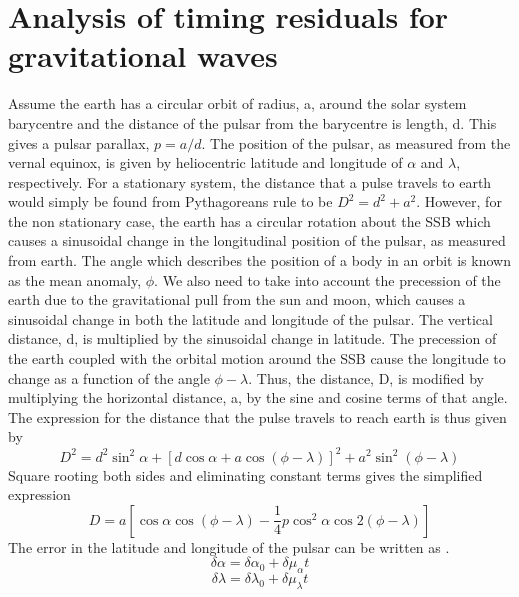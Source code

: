 \documentclass[12pt]{article}
\begin{document}
	\section{Analysis of timing residuals for gravitational waves}\label{Analysis of timing residuals for gravitational waves}
	
	\noindent Assume the earth has a circular orbit of radius, a, around the solar system barycentre and the distance of the pulsar from the barycentre is length, d. This gives a pulsar parallax, $p=a/d$. The position of the pulsar, as measured from the vernal equinox, is given by heliocentric latitude and longitude of $\alpha$ and $\lambda$, respectively. For a stationary system, the distance that a pulse travels to earth would simply be found from Pythagoreans rule to be $D^2=d^2+a^2$. However, for the non stationary case, the earth has a circular rotation about the SSB which causes a sinusoidal change in the longitudinal position of the pulsar, as measured from earth. The angle which describes the position of a body in an orbit is known as the mean anomaly, $\phi$.  We also need to take into account the precession of the earth due to the gravitational pull from the sun and moon, which causes a sinusoidal change in both the latitude and longitude of the pulsar. The vertical distance, d, is multiplied by the sinusoidal change in latitude. The precession of the earth coupled with the orbital motion around the SSB cause the longitude to change as a function of the angle $\phi-\lambda$. Thus, the distance, D, is modified by multiplying the horizontal distance, a, by the sine and cosine terms of that angle. The expression for the distance that the pulse travels to reach earth is thus given by
	\begin{equation}\label{D eqn}
	D^2=d^2 \sin^2{\alpha}+[d \cos{\alpha}+a \cos(\phi-\lambda)]^2+a^2 \sin^2(\phi-\lambda)
	\end{equation}
	Square rooting both sides and eliminating constant terms gives the simplified expression 
	\begin{equation}\label{simplified D eqn}
	D=a[\cos \alpha \cos(\phi-\lambda)-\frac{1}{4}p\cos^2{\alpha} \cos{2(\phi-\lambda)}]
	\end{equation}
	The error in the latitude and longitude of the pulsar can be written as \cite{blandford1976arrival}.
	\begin{equation}\label{error in latitude}
	\delta\alpha=\delta\alpha_{0}+\delta\mu_{\alpha}t
	\end{equation}
	\begin{equation}\label{error in longitude}
	\delta\lambda=\delta\lambda_{0}+\delta\mu_{\lambda}t
	\end{equation}
\end{document}
